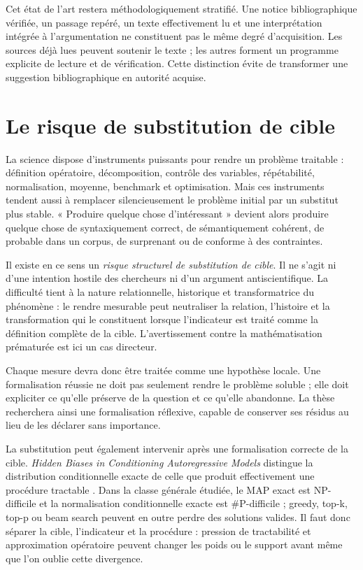 \documentclass[11pt,a4paper]{article}
\begin{document}
Cet état de l'art restera méthodologiquement stratifié. Une notice
bibliographique vérifiée, un passage repéré, un texte effectivement lu et une
interprétation intégrée à l'argumentation ne constituent pas le même degré
d'acquisition. Les sources déjà lues peuvent soutenir le texte ; les autres
forment un programme explicite de lecture et de vérification. Cette distinction
évite de transformer une suggestion bibliographique en autorité acquise.

\section{Le risque de substitution de cible}

La science dispose d'instruments puissants pour rendre un problème traitable :
définition opératoire, décomposition, contrôle des variables, répétabilité,
normalisation, moyenne, benchmark et optimisation. Mais ces instruments tendent
aussi à remplacer silencieusement le problème initial par un substitut plus
stable. « Produire quelque chose d'intéressant » devient alors produire quelque
chose de syntaxiquement correct, de sémantiquement cohérent, de probable dans un
corpus, de surprenant ou de conforme à des contraintes.

Il existe en ce sens un \emph{risque structurel de substitution de cible}. Il ne
s'agit ni d'une intention hostile des chercheurs ni d'un argument
antiscientifique. La difficulté tient à la nature relationnelle, historique et
transformatrice du phénomène : le rendre mesurable peut neutraliser la relation,
l'histoire et la transformation qui le constituent lorsque l'indicateur est
traité comme la définition complète de la cible. L'avertissement contre la
mathématisation prématurée
\parencite{russell1995rationality,russell1995awardlecture} est ici un cas
directeur.

Chaque mesure devra donc être traitée comme une hypothèse locale. Une
formalisation réussie ne doit pas seulement rendre le problème soluble ; elle
doit expliciter ce qu'elle préserve de la question et ce qu'elle abandonne. La
thèse recherchera ainsi une formalisation réflexive, capable de conserver ses
résidus au lieu de les déclarer sans importance.

La substitution peut également intervenir après une formalisation correcte de
la cible. \emph{Hidden Biases in Conditioning Autoregressive Models} distingue
la distribution conditionnelle exacte de celle que produit effectivement une
procédure tractable \parencite{pachet2026biases}. Dans la classe générale
étudiée, le MAP exact est NP-difficile et la normalisation conditionnelle exacte
est \#P-difficile ; greedy, top-k, top-p ou beam search peuvent en outre perdre
des solutions valides. Il faut donc séparer la cible, l'indicateur et la
procédure : pression de tractabilité et approximation opératoire peuvent changer
les poids ou le support avant même que l'on oublie cette divergence.
\end{document}
